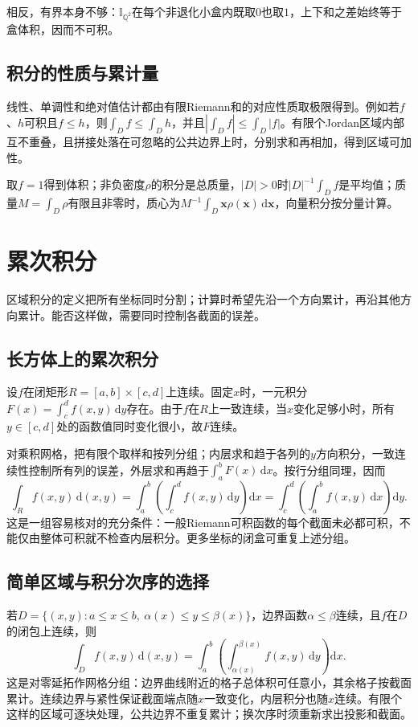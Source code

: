 相反，有界本身不够：$\mathbb I_{\mathbb Q^2}$在每个非退化小盒内既取$0$也取$1$，上下和之差始终等于盒体积，因而不可积。

\subsection{积分的性质与累计量}

线性、单调性和绝对值估计都由有限Riemann和的对应性质取极限得到。例如若$f$、$h$可积且$f\leq h$，则$\int_D f\leq\int_D h$，并且$|\int_D f|\leq\int_D|f|$。有限个Jordan区域内部互不重叠，且拼接处落在可忽略的公共边界上时，分别求和再相加，得到区域可加性。

取$f=1$得到体积；非负密度$\rho$的积分是总质量，$|D|>0$时$|D|^{-1}\int_D f$是平均值；质量$M=\int_D\rho$有限且非零时，质心为$M^{-1}\int_D\bm x\rho(\bm x)\,\mathrm d\bm x$，向量积分按分量计算。

\section{累次积分}

区域积分的定义把所有坐标同时分割；计算时希望先沿一个方向累计，再沿其他方向累计。能否这样做，需要同时控制各截面的误差。

\subsection{长方体上的累次积分}

设$f$在闭矩形$R=[a,b]\times[c,d]$上连续。固定$x$时，一元积分$F(x)=\int_c^d f(x,y)\,\mathrm dy$存在。由于$f$在$R$上一致连续，当$x$变化足够小时，所有$y\in[c,d]$处的函数值同时变化很小，故$F$连续。

对乘积网格，把有限个取样和按列分组；内层求和趋于各列的$y$方向积分，一致连续性控制所有列的误差，外层求和再趋于$\int_a^bF(x)\,\mathrm dx$。按行分组同理，因而
\[
 \int_R f(x,y)\,\mathrm d(x,y)
 =\int_a^b\left(\int_c^d f(x,y)\,\mathrm dy\right)\mathrm dx
 =\int_c^d\left(\int_a^b f(x,y)\,\mathrm dx\right)\mathrm dy.
\]
这是一组容易核对的充分条件：一般Riemann可积函数的每个截面未必都可积，不能仅由整体可积就不检查内层积分。更多坐标的闭盒可重复上述分组。

\subsection{简单区域与积分次序的选择}

若$D=\{(x,y):a\leq x\leq b,\ \alpha(x)\leq y\leq\beta(x)\}$，边界函数$\alpha\leq\beta$连续，且$f$在$D$的闭包上连续，则
\[
 \int_D f(x,y)\,\mathrm d(x,y)
 =\int_a^b\left(\int_{\alpha(x)}^{\beta(x)}f(x,y)\,\mathrm dy\right)\mathrm dx.
\]
这是对零延拓作网格分组：边界曲线附近的格子总体积可任意小，其余格子按截面累计。连续边界与紧性保证截面端点随$x$一致变化，内层积分也随$x$连续。有限个这样的区域可逐块处理，公共边界不重复累计；换次序时须重新求出投影和截面。

